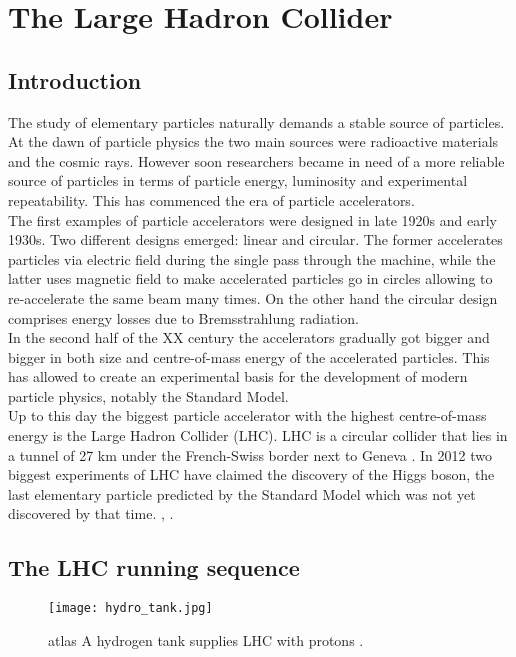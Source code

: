 \chapter{The Large Hadron Collider}
    
   
        
    \section{Introduction}
    
        The study of elementary particles naturally demands a stable source of particles. At the dawn of particle physics the two main sources were radioactive materials and the cosmic rays. However soon researchers became in need of a more reliable source of particles in terms of particle energy, luminosity and experimental repeatability. This has commenced the era of particle accelerators.\\
        The first examples of particle accelerators were designed in late 1920s and early 1930s. Two different designs emerged: linear and circular. The former accelerates particles via electric field during the single pass through the machine, while the latter uses magnetic field to make accelerated particles go in circles allowing to re-accelerate the same beam many times. On the other hand the circular design comprises energy losses due to Bremsstrahlung radiation.\\
        In the second half of the XX century the accelerators gradually got bigger and bigger in both size and centre-of-mass energy of the accelerated particles. This has allowed to create an experimental basis for the development of modern particle physics, notably the Standard Model.\\
        Up to this day the biggest particle accelerator with the highest centre-of-mass energy is the Large Hadron Collider (LHC). LHC is a circular collider that lies in a tunnel of 27 km under the French-Swiss border next to Geneva \cite{Bruning:2668521}. In 2012 two biggest experiments of LHC have claimed the discovery of the Higgs boson, the last elementary particle predicted by the Standard Model which was not yet discovered by that time. \cite{higgs_atlas}, \cite{higgs_cms}.
        
        \section{The LHC running sequence}
                   \begin{figure}[htpb]
        	\texttt{[image: hydro\_tank.jpg]}
        	\caption{ \gls{atlas} A hydrogen tank supplies LHC with protons \cite{hydro}.}
        	\label{fig::hydro}
        \end{figure}
        	
